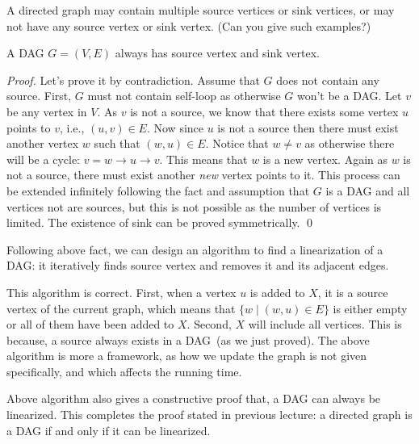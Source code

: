 A directed graph may contain multiple source vertices or sink vertices,
or may not have any source vertex or sink vertex. (Can you give such examples?)

\begin{claim}
A DAG $G=(V,E)$ always has source vertex and sink vertex.
\end{claim}
\emph{Proof.} Let's prove it by contradiction. Assume that $G$ does not contain any source.
First, $G$ must not contain self-loop as otherwise $G$ won't be a DAG.
Let $v$ be any vertex in $V$. As $v$ is not a source, we know that there exists some vertex $u$ points to $v$, i.e., $(u,v)\in E$.
Now since $u$ is not a source then there must exist another vertex $w$ such that $(w,u)\in E$.
Notice that $w \neq v$ as otherwise there will be a cycle: $v = w \to u \to v$.
This means that $w$ is a new vertex. Again as $w$ is not a source, there must exist another \emph{new} vertex points to it.
This process can be extended infinitely following the fact and assumption that $G$ is a DAG and all vertices not are sources,
but this is not possible as the number of vertices is limited. 
The existence of sink can be proved symmetrically. \qed


Following above fact, we can design an algorithm to find a linearization of a DAG: it iteratively
finds source vertex and removes it and its adjacent edges.

\begin{minipage}{0.8\textwidth}
	\xxx
	\xxx
	\xxx
	\xxx
	\xxx
	\xxx
	\xxx
	\xxx
\end{minipage}

This algorithm is correct. First, when a vertex $u$ is added to $X$,
it is a source vertex of the current graph, which means that
$\{w\mid (w, u)\in E\}$ is either empty or all of them
have been added to $X$. Second, $X$ will include all vertices.
This is because, a source always exists in a DAG~(as we just proved).
The above algorithm is more a framework, as how we update the graph
is not given specifically, and which affects the running time.

Above algorithm also gives a constructive proof that, a DAG can always
be linearized. This completes the proof stated in previous lecture: a directed graph is a DAG if and only if it can be linearized.

